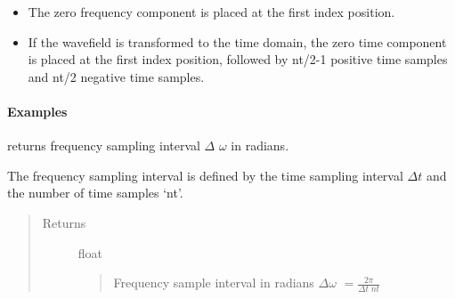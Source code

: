 \documentclass[letterpaper,10pt,english]{sphinxmanual}
\begin{document}
\begin{fulllineitems}
\begin{description}
\begin{itemize}
\item {} 
The zero frequency component is placed at the first index position.

\item {} 
If the wavefield is transformed to the time domain, the zero time component is placed at the first index position, followed by nt/2-1 positive time samples and nt/2 negative time samples.

\end{itemize}

\end{description}
\paragraph{Examples}

%
\begin{sphinxVerbatim}[commandchars=\\\{\}]
     
\end{sphinxVerbatim}

\begin{fulllineitems}
\label{\detokenize{Wavefield_NRM_p_w:Wavefield_NRM_p_w.Wavefield_NRM_p_w.Dw}}
returns frequency sampling interval \(\Delta\) \(\omega\) in radians.

The frequency sampling interval is defined by the time sampling interval \(\Delta t\) and the number of time samples ‘nt’.
\begin{quote}\begin{description}
\item[{Returns}] \leavevmode
float
\begin{quote}

Frequency sample interval in radians \(\Delta \omega\) \(= \frac{2 \pi}{\Delta t \; nt}\)
\end{quote}

\end{description}\end{quote}

\end{fulllineitems}
\end{fulllineitems}
\end{document}

